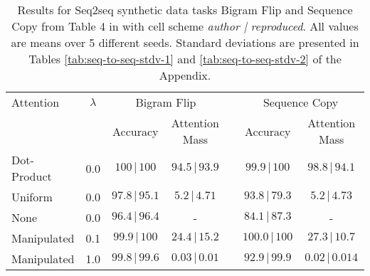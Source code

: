 \begin{table}
\centering
\caption{Results for Seq2seq synthetic data tasks Bigram Flip and Sequence Copy from Table 4 in \citet{pruthi-etal-2020-learning} with cell scheme \textit{author | reproduced}. All values are means over 5 different seeds. Standard deviations are presented in Tables \ref{tab:seq-to-seq-stdv-1} and \ref{tab:seq-to-seq-stdv-2} of the Appendix.}
\label{tab:authors-seq-to-seq-results-1}
\begin{tabular}{lcccccc} 
\toprule
Attention   & $\lambda$ & \multicolumn{2}{c}{Bigram Flip}               &  & \multicolumn{2}{c}{Sequence Copy}               \\ 
\cline{3-4}\cline{6-7}
            &           & Accuracy                  & Attention Mass                  &  & Accuracy                  & Attention Mass                    \\ 
\midrule
Dot-Product & 0.0       & $100\pmb{\,|\,}100$   & $94.5\pmb{\,|\,}93.9$ &  & $99.9\pmb{\,|\,}100$  & $98.8\pmb{\,|\,}94.1$   \\ 
\midrule
Uniform     & 0.0       & $97.8\pmb{\,|\,}95.1$ & $5.2\pmb{\,|\,}4.71$  &  & $93.8\pmb{\,|\,}79.3$ & $5.2\pmb{\,|\,}4.73$    \\
None        & 0.0       & $96.4\pmb{\,|\,}96.4$ & -                     &  & $84.1\pmb{\,|\,}87.3$ & -                       \\ 
\midrule
Manipulated & 0.1       & $99.9\pmb{\,|\,}100$  & $24.4\pmb{\,|\,}15.2$ &  & $100.0\pmb{\,|\,}100$ & $27.3\pmb{\,|\,}10.7$   \\
Manipulated & 1.0       & $99.8\pmb{\,|\,}99.6$ & $0.03\pmb{\,|\,}0.01$ &  & $92.9\pmb{\,|\,}99.9$ & $0.02\pmb{\,|\,}0.014$  \\
\bottomrule
\end{tabular}
\end{table}


